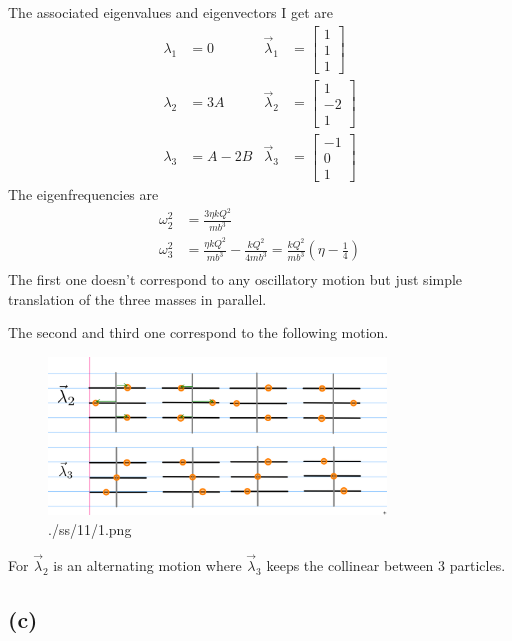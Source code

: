\documentclass[letter, 10pts]{article}
\begin{document}
The associated eigenvalues and eigenvectors I get are 
\begin{align*}
	\lambda_1 &= 0 
		  &\vec{\lambda}_1 &= \begin{bmatrix} 1 \\ 1 \\ 1 \end{bmatrix} \\ 
	\lambda_2 &= 3 A 
		  & \vec{\lambda}_2 &= \begin{bmatrix} 1 \\ -2 \\ 1 \end{bmatrix} \\
	\lambda_3 &= A - 2B 
		  & \vec{\lambda}_3 &= \begin{bmatrix} -1 \\ 0 \\ 1 \end{bmatrix} 
\end{align*}
The eigenfrequencies are 
\begin{align*}
\omega_2^2 &= \frac{3 \eta k Q^2}{m b^3} \\
\omega_3^2 &= \frac{\eta k Q^2}{m b^3} - \frac{k Q^2}{4 m b^3} = 
  \frac{k Q^2}{m b^3} \left(\eta - \frac{1}{4}\right)
\\
\end{align*}
The first one doesn't correspond to any oscillatory motion but just simple translation of the three masses in parallel. 

The second and third one correspond to the following motion. 
\begin{figure}[H]
	\centering
	\includegraphics[width=0.8\textwidth]{./ss/11/1.png}
	\caption{./ss/11/1.png}
	\label{fig:-ss-11-1-png}
\end{figure}

For $\vec{\lambda}_2$ is an alternating motion where $\vec{\lambda}_3$ keeps the collinear between 3 particles.



\subsection*{(c)} 
\end{document}
